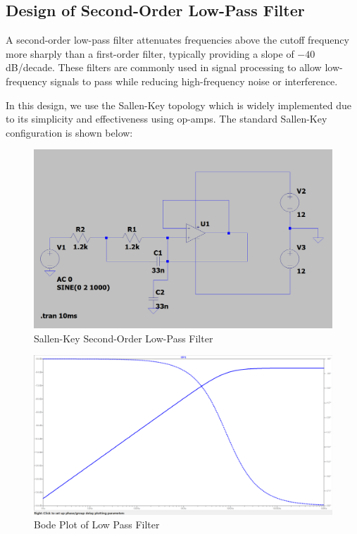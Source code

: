\subsection{Design of Second-Order Low-Pass Filter}

A second-order low-pass filter attenuates frequencies above the cutoff frequency more sharply than a first-order filter, typically providing a slope of $-40$ dB/decade. These filters are commonly used in signal processing to allow low-frequency signals to pass while reducing high-frequency noise or interference.

In this design, we use the Sallen-Key topology which is widely implemented due to its simplicity and effectiveness using op-amps. The standard Sallen-Key configuration is shown below:

\begin{figure}[H]
    \centering
    \includegraphics[width=0.9\linewidth]{sec/low-pass/helloworld.png}
    \caption{Sallen-Key Second-Order Low-Pass Filter}
    \label{fig:sallen-key}
\end{figure}

\begin{figure}[H]
    \centering
    \includegraphics[width=0.95\linewidth]{sec/low-pass/image.png}
    \caption{Bode Plot of Low Pass Filter}
    \label{fig:enter-label}
\end{figure}

